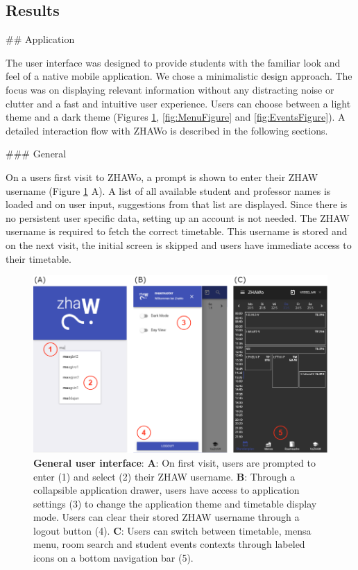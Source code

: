 \begin{markdown}
\section{Results} \label{results}

## Application

The user interface was designed to provide students with the familiar look and feel of a native mobile application. We chose a minimalistic design approach. The focus was on displaying relevant information without any distracting noise or clutter and a fast and intuitive user experience. Users can choose between a light theme and a dark theme (Figures \ref{fig:LoginFigure}, \ref{fig:MenuFigure} and \ref{fig:EventsFigure}). A detailed interaction flow with ZHAWo is described in the following sections.

### General

On a users first visit to ZHAWo, a prompt is shown to enter their ZHAW username (Figure \ref{fig:LoginFigure} A). A list of all available student and professor names is loaded and on user input, suggestions from that list are displayed. Since there is no persistent user specific data, setting up an account is not needed. The ZHAW username is required to fetch the correct timetable. This username is stored and on the next visit, the initial screen is skipped and users have immediate access to their timetable.

\begin{figure}[H]
  \includegraphics[width=16cm, center]{./figures/login_figure.png}
  \captionsetup{width=15.5cm}
  \caption[General user interface]{\textbf{General user interface}: \textbf{A}: On first visit, users are prompted to enter (1) and select (2) their ZHAW username. \textbf{B}: Through a collapsible application drawer, users have access to application settings (3) to change the application theme and timetable display mode. Users can clear their stored ZHAW username through a logout button (4). \textbf{C}: Users can switch between timetable, mensa menu, room search and student events contexts through labeled icons on a bottom navigation bar (5).}
  \label{fig:LoginFigure}
\end{figure}


\end{markdown}
